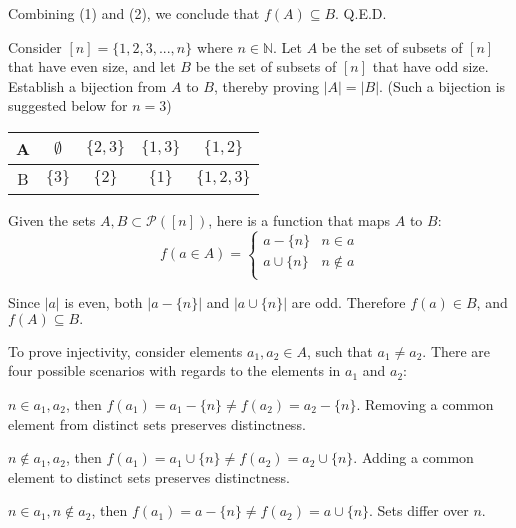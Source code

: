 \documentclass[addpoints]{exam}
\begin{document}
\begin{questions}
\begin{solution}
Combining (1) and (2), we conclude that $f(A) \subseteq B$. Q.E.D.

  

  \end{solution}

\question[15] Consider $[n] = \{1,2,3,...,n\}$ where $n \in \mathbb{N}$. Let $A$ be the set of subsets of $[n]$ that have even size, and let $B$ be the set of subsets of $[n]$ that have odd size. Establish a bijection from $A$ to $B$, thereby proving $|A| = |B|$. (Such a bijection is suggested below for $n = 3$) 

\begin{center}

  \begin{tabular}{ |c || c | c | c |c |}
    \hline
 A & $\emptyset$ & $\{2,3\}$ & $\{1,3\}$ & $\{1,2\}$ \\ \hline
 B & $\{3\}$ & $\{2\}$ & $\{1\}$ & $\{1,2,3\}$\\\hline
\end{tabular}
\end{center}

  \begin{solution}
  Given the sets $A,B \subset \mathcal{P}([n])$, here is a function that maps $A$ to $B$:
  \[ 
    f(a \in A)=
    \begin{cases} 
      a - \{n\}  & n \in a \\
      a \cup \{n\} & n \not\in a \\      
   \end{cases}
 \]
 
 Since $|a|$ is even, both $|a - \{n\}|$ and $|a \cup \{n\}|$ are odd. Therefore $f(a) \in B$, and $f(A) \subseteq B.$

 To prove injectivity, consider elements $a_1,a_2 \in A$, such that $a_1 \not= a_2$. There are four possible scenarios with regards to the elements in $a_1$ and $a_2$:

 \begin{subparts}
 \subpart $n  \in a_1, a_2$, then $f(a_1) = a_1 - \{n\} \not= f(a_2) = a_2 - \{n\}$. Removing a common element from distinct sets preserves distinctness.

 \subpart $n \not \in a_1,a_2$, then $f(a_1) = a_1 \cup \{n\} \not= f(a_2) = a_2 \cup \{n\}$. Adding a common element to distinct sets preserves distinctness.

 \subpart $n \in a_1, n \not \in a_2$, then $f(a_1) = a - \{n\} \not= f(a_2) = a \cup \{n\}$. Sets differ over $n$.


\end{subparts}
\end{solution}
\end{questions}
\end{document}

